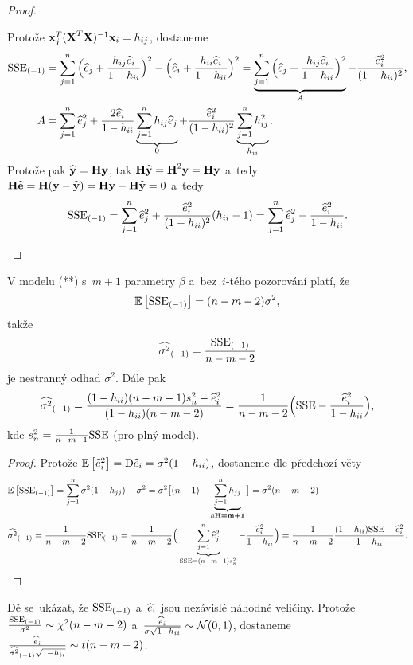 \begin{theorem}
\begin{proof}
\begin{enumerate}[1)]
		Protože $\textbf{x}_j^T(\textbf{X}^T\textbf{X})^{-1} \textbf{x}_i=h_{ij}$, dostaneme
		\[
	\begin{split}
	{\mathrm{SSE}_{(-1)}}&=\sum\limits_{j=1}^{n} \Big(\widehat{e}_j+\frac{h_{ij}\widehat{e}_i}{1-h_{ii}}\Big)^2-\Big(\widehat{e}_i+\frac{h_{ii}\widehat{e}_i}{1-h_{ii}}\Big)^2=\underbrace{\sum\limits_{j=1}^{n}\Big(\widehat{e}_j+\frac{h_{ij}\widehat{e}_i}{1-h_{ii}}\Big)^2}_{A}-\frac{\widehat{e}_i^2}{(1-h_{ii})^2},\\
	A&= \sum\limits_{j=1}^{n} \widehat{e}_j^2+\frac{2\widehat{e}_i}{1-h_{ii}}\underbrace{\sum\limits_{j=1}^{n} h_{ij}\widehat{e}_j}_{0}+\frac{\widehat{e}_i^2}{(1-h_{ii})^2}\underbrace{\sum\limits_{j=1}^{n} h_{ij}^2}_{h_{ii}}.
	\end{split}
	\]
		Protože pak $\widehat{\textbf{y}}=\textbf{H}\textbf{y}$, tak $\textbf{H}\widehat{\textbf{y}}=\textbf{H}^2\textbf{y}=\textbf{H}\textbf{y}$ a~tedy $\textbf{H}\widehat{\textbf{e}}=\textbf{H}(\textbf{y}-\widehat{\textbf{y}})=\textbf{H}\textbf{y}-\textbf{H}\widehat{\textbf{y}}=0$ a~tedy 
		$$ {\mathrm{SSE}_{(-1)}}=\sum\limits_{j=1}^{n}\widehat{e}_j^2+\frac{\widehat{e}_i^2}{(1-h_{ii})^2}(h_{ii}-1)=\sum\limits_{j=1}^{n}\widehat{e}_j^2-\frac{\widehat{e}_i^2}{1-h_{ii}}.$$
	\end{enumerate}
\end{proof}
\end{theorem}

\begin{dusl}
	V modelu (**) s~$m+1$ parametry $\beta$ a~bez~$i$-tého pozorování platí, že $$\mathbb{E}\left[ {\mathrm{SSE}_{(-1)}} \right]=(n-m-2)\sigma^2,$$
	takže 
	$$ {\widehat{{\sigma}^2}_{(-1)}}=\frac{{\mathrm{SSE}_{(-1)}}}{n-m-2}$$ je nestranný odhad $\sigma^2$. Dále pak 
	$$ {\widehat{{\sigma}^2}_{(-1)}}=\frac{(1-h_{ii})(n-m-1)s_n^2-\widehat{e}_i^2}{(1-h_{ii})(n-m-2)}=\frac{1}{n-m-2}\Big(\mathrm{SSE} -\frac{\widehat{e}_i^2}{1-h_{ii}}\Big),$$ kde $s_n^2=\frac{1}{n-m-1}\mathrm{SSE}$ (pro plný model).
	\begin{proof}
		Protože $\mathbb{E}\left[ \widehat{e}_i^2 \right]=\mathrm{D} \widehat{e}_i=\sigma^2(1-h_{ii})$, dostaneme dle předchozí věty 
		\[
		\begin{split}
		&\mathbb{E}\left[ {\mathrm{SSE}_{(-1)}} \right]=\sum\limits_{j=1}^{n}\sigma^2(1-h_{jj})-\sigma^2=\sigma^2\big[(n-1)-\underbrace{\sum\limits_{j=1}^{n} h_{jj}}_{h\textbf{H=m+1}}\big]=\sigma^2(n-m-2)\\
		&{\widehat{{\sigma}^2}_{(-1)}}=\frac{1}{n-m-2}{\mathrm{SSE}_{(-1)}}=\frac{1}{n-m-2}\Big(\underbrace{\sum\limits_{j=1}^{n}\widehat{e}_j^2}_{\mathrm{SSE}=(n-m-1)s_n^2}-\frac{\widehat{e}_i^2}{1-h_{ii}}\Big)=\frac{1}{n-m-2}\frac{(1-h_{ii})\mathrm{SSE}-\widehat{e}_i^2}{1-h_{ii}}.
		\end{split}
		\]
	\end{proof}
\end{dusl}

\begin{remark}
	Dě se~ukázat, že ${\mathrm{SSE}_{(-1)}}$ a~$\widehat{e}_i$ jsou nezávislé náhodné veličiny. Protože $\frac{{\mathrm{SSE}_{(-1)}}}{\sigma^2}\sim\chi^2(n-m-2)$ a~$\frac{\widehat{e}_i}{\sigma\sqrt{1-h_{ii}}}\sim\mathcal{N}(0,1)$, dostaneme $\frac{\widehat{e}_i}{{\widehat{{\sigma}^2}_{(-1)}}\sqrt{1-h_{ii}}}\sim t(n-m-2)$.
\end{remark}

